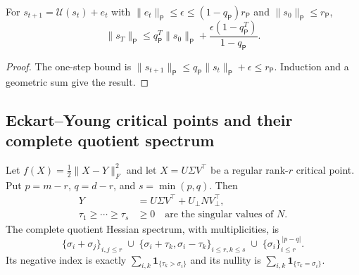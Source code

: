 \begin{corollary}
For $s_{t+1}=\mathscr U(s_t)+e_t$ with
$\|e_t\|_{\mathsf P}\leq\epsilon\leq
(1-q_{\mathsf P})r_{\mathsf P}$ and
$\|s_0\|_{\mathsf P}\leq r_{\mathsf P}$,
\begin{equation}
\|s_T\|_{\mathsf P}
\leq q_{\mathsf P}^T\|s_0\|_{\mathsf P}
+\frac{\epsilon(1-q_{\mathsf P}^T)}{1-q_{\mathsf P}} .
\end{equation}
\end{corollary}
\begin{proof}
The one-step bound is
$\|s_{t+1}\|_{\mathsf P}\leq
q_{\mathsf P}\|s_t\|_{\mathsf P}+\epsilon\leq r_{\mathsf P}$.
Induction and a geometric sum give the result.
\end{proof}


\subsection{Eckart--Young critical points and their complete quotient spectrum}
\begin{theorem}
\label{thm:sharp-critical-spectrum}
Let $f(X)=\frac12\|X-Y\|_F^2$ and let $X=U\Sigma V^\top$ be a
regular rank-$r$ critical point. Put $p=m-r$, $q=d-r$, and
$s=\min(p,q)$. Then
\begin{align}
Y&=U\Sigma V^\top+U_\perp N V_\perp^\top,\\
\tau_1\geq\cdots\geq\tau_s&\geq0
\quad\text{are the singular values of }N .
\end{align}
The complete quotient Hessian spectrum, with multiplicities, is
\begin{equation}
\{\sigma_i+\sigma_j\}_{i,j\leq r}
\;\cup\;
\{\sigma_i+\tau_k,\sigma_i-\tau_k\}_{i\leq r,k\leq s}
\;\cup\;
\{\sigma_i\}_{i\leq r}^{\,|p-q|}.
\label{eq:sharp-critical-spectrum}
\end{equation}
Its negative index is exactly
$\sum_{i,k}\mathbf1_{\{\tau_k>\sigma_i\}}$ and its nullity is
$\sum_{i,k}\mathbf1_{\{\tau_k=\sigma_i\}}$.
\end{theorem}
